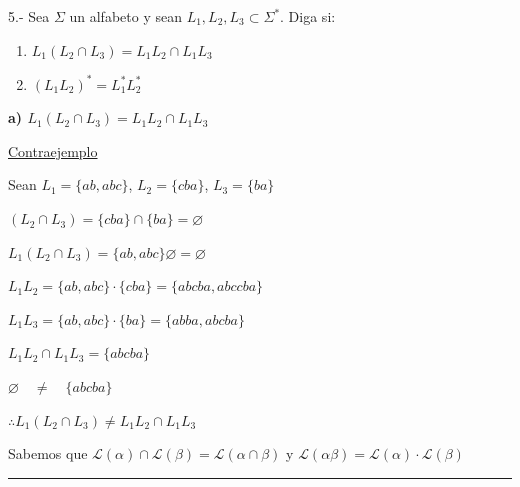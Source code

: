 5.- Sea $\Sigma$ un alfabeto y sean $L_1, L_2, L_3 \subset \Sigma^*$. Diga si:

\begin{enumerate}[label=\alph*)]
    \item $L_1(L_2 \cap L_3) = L_1 L_2 \cap L_1 L_3$
    \item $(L_1 L_2)^* = L_1^* L_2^*$
\end{enumerate}

\vspace{0.3cm}
\noindent\textbf{a) $L_1(L_2 \cap L_3) = L_1 L_2 \cap L_1 L_3$}

\vspace{0.2cm}
\noindent
\begin{minipage}[t]{0.62\textwidth}
\underline{Contraejemplo}

\vspace{0.25cm}
\quad Sean $L_1 = \{ab, abc\}$, $L_2 = \{cba\}$, $L_3 = \{ba\}$

\vspace{0.25cm}
\quad $(L_2 \cap L_3) = \{cba\} \cap \{ba\} = \varnothing$

\vspace{0.25cm}
\quad $L_1(L_2 \cap L_3) = \{ab, abc\}\varnothing = \varnothing$

\vspace{0.25cm}
\quad $L_1 L_2 = \{ab, abc\} \cdot \{cba\} = \{abcba, abccba\}$

\vspace{0.25cm}
\quad $L_1 L_3 = \{ab, abc\} \cdot \{ba\} = \{abba, abcba\}$

\vspace{0.25cm}
\quad\quad $L_1 L_2 \cap L_1 L_3 = \{abcba\}$

\vspace{0.25cm}
\quad\quad $\varnothing \quad \neq \quad \{abcba\}$

\vspace{0.3cm}
$\therefore L_1(L_2 \cap L_3) \neq L_1 L_2 \cap L_1 L_3$
\end{minipage}\hfill
\begin{minipage}[t]{0.35\textwidth}
\raggedleft
Sabemos que $\mathscr{L}(\alpha) \cap \mathscr{L}(\beta) = \mathscr{L}(\alpha \cap \beta)$ y $\mathscr{L}(\alpha\beta) = \mathscr{L}(\alpha) \cdot \mathscr{L}(\beta)$
\end{minipage}

\vspace{0.4cm}
\hrule
\vspace{0.4cm}

